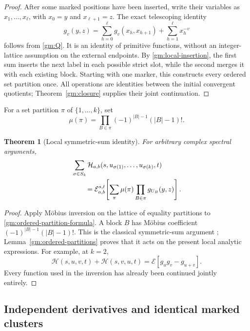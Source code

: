 \documentclass[11pt,a4paper]{article}
\numberwithin{equation}{section}
\newtheorem{theorem}{Theorem}[section]
\theoremstyle{definition}
\theoremstyle{remark}
\begin{document}
\begin{proof}
After some marked positions have been inserted, write their variables
as \(x_1,\ldots,x_\ell\), with \(x_0=y\) and
\(x_{\ell+1}=z\).  The exact telescoping identity
\begin{equation}\label{gm:split}
 g_v(y,z)=\sum_{h=0}^\ell g_v(x_h,x_{h+1})
                              +\sum_{h=1}^\ell x_h^{-v}
\end{equation}
follows from \eqref{gm:Q}.  It is an identity of primitive functions,
without an integer-lattice assumption on the external endpoints.
By \eqref{gm:local-insertion}, the first sum inserts the next label
in each possible strict slot, while the second merges it with each
existing block.  Starting with one marker, this constructs every
ordered set partition once.  All operations are identities between the
initial convergent quotients; Theorem~\ref{gm:closure} supplies their
joint continuation.
\end{proof}

For a set partition \(\pi\) of \(\{1,\ldots,k\}\), set
\[
 \mu(\pi)=\prod_{B\in\pi}(-1)^{|B|-1}(|B|-1)!.
\]

\begin{theorem}[Local symmetric-sum identity]
\label{gm:symmetric}
For arbitrary complex spectral arguments,
\begin{align}\label{gm:symmetric-formula}
 &\sum_{\sigma\in S_k}
       \mathcal H_{a,b}(s,u_{\sigma(1)},\ldots,u_{\sigma(k)},t)
 \notag\\
 &\qquad=\mathcal E_{a,b}^{s,t}\!\left[
        \sum_{\pi}\mu(\pi)\prod_{B\in\pi}g_{U_B}(y,z)\right].
\end{align}
\end{theorem}

\begin{proof}
Apply M\"obius inversion on the lattice of equality partitions to
\eqref{gm:ordered-partition-formula}.  A block \(B\) has M\"obius
coefficient \((-1)^{|B|-1}(|B|-1)!\).  This is the classical
symmetric-sum argument \cite{gm:Hoffman1992,gm:Hoffman2018};
Lemma~\ref{gm:ordered-partitions} proves that it acts on the present
local analytic expressions.  For example, at \(k=2\),
\[
 \mathcal H(s,u,v,t)+\mathcal H(s,v,u,t)
          =\mathcal E[g_ug_v-g_{u+v}].
\]
Every function used in the inversion has already been continued
jointly entirely.
\end{proof}

\subsection{Independent derivatives and identical marked clusters}
\end{document}
